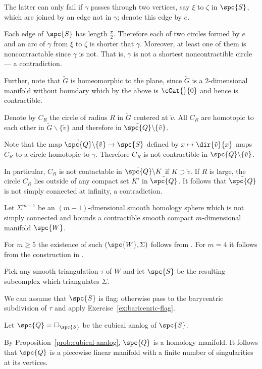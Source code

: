 The latter can only fail if $\gamma$ passes through two vertices, say $\xi$ to $\zeta$ in $\spc{S}$,
which are joined by an edge not in $\gamma$; 
denote this edge by $e$.

Each edge of $\spc{S}$ has length $\tfrac\pi2$.
Therefore each of two circles formed by $e$ and an arc of $\gamma$
from $\xi$ to $\zeta$ is shorter that $\gamma$.
Moreover,
at least one of them is noncontractable 
since $\gamma$ is not.
That is, 
$\gamma$ is not a shortest noncontractible circle 
--- a contradiction.
\claimqeds

Further, note that 
$\tilde G$ is homeomorphic to the plane, 
since $\tilde G$ is 
a 2-dimensional manifold without boundary which 
by the above is $\cCat{}{0}$ and hence is contractible.

Denote by $C_R$ the circle of radius $R$ in $\tilde G$ centered at $\tilde v$.
All $C_R$ are homotopic to each other in $\tilde G\backslash\{\tilde v\}$ and therefore in $\tilde{\spc{Q}}\backslash \{\tilde v\}$.

Note that the map $\tilde{\spc{Q}}\backslash \{\tilde v\}\to \spc{S}$
defined by $x\mapsto\dir{\tilde v}{x}$ maps $C_R$ to a circle homotopic to $\gamma$.
Therefore $C_R$ is not contractible in $\tilde{\spc{Q}}\backslash \{\tilde v\}$.

In particular, 
$C_R$ is not contactable in $\tilde{\spc{Q}}\backslash K$
if $K\supset \tilde v$.
If $R$ is large, 
the circle $C_R$  
lies outside of any compact set $K'$ in $\tilde{\spc{Q}}$.
It follows that $\tilde{\spc{Q}}$ is not simply connected at infinity, a contradiction.
\qeds

Let $\Sigma^{m-1}$ be an $(m-1)$-dmensional smooth homology sphere which is not simply connected and bounds a contractible smooth compact $m$-dimensional manifold $\spc{W}$. 

For $m\ge 5$ the existence of such $(\spc{W}, \Sigma)$ follows from \cite{kervaire}. 
For $m=4$ it follows from the construction in \cite{mazur}.

Pick any smooth triangulation $\tau$ of $W$ and let $\spc{S}$ be the resulting subcomplex which triangulates $\Sigma$.


We can assume that $\spc{S}$ is flag; 
otherwise pass to the barycentric subdivision 
of $\tau$ and apply Exercise~\ref{ex:baricenric-flag}.


Let $\spc{Q}=\square_{\spc{S}}$ be the cubical analog of $\spc{S}$.

By Proposition~\ref{prob:cubical-analog},
$\spc{Q}$ is a homology manifold.
It follows that $\spc{Q}$ is a piecewise linear manifold 
with a finite number of singularities at its vertices.


